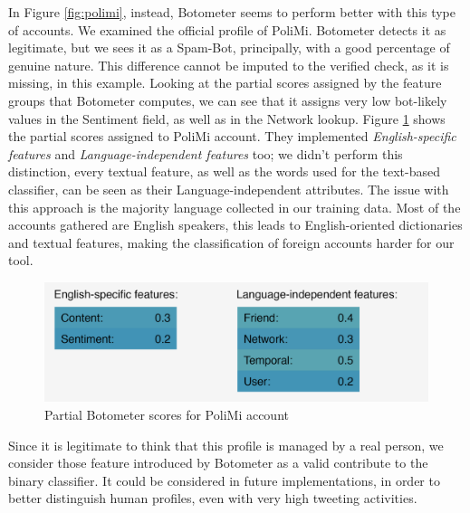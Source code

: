 In Figure \ref{fig:polimi}, instead, Botometer seems to perform better with this type of accounts. We examined the official profile of PoliMi. Botometer detects it as legitimate, but we sees it as a Spam-Bot, principally, with a good percentage of genuine nature. This difference cannot be imputed to the verified check, as it is missing, in this example.
Looking at the partial scores assigned by the feature groups that Botometer computes, we can see that it assigns very low bot-likely values in the Sentiment field, as well as in the Network lookup. Figure \ref{fig:polimi_details} shows the partial scores assigned to PoliMi account. They implemented \textit{English-specific features} and \textit{Language-independent features} too; we didn't perform this distinction, every textual feature, as well as the words used for the text-based classifier, can be seen as their Language-independent attributes. The issue with this approach is the majority language collected in our training data. Most of the accounts gathered are English speakers, this leads to English-oriented dictionaries and textual features, making the classification of foreign accounts harder for our tool.
\begin{figure}[htp!]
	\begin{center}
		\includegraphics[width=0.8\columnwidth]{chapter7/figure/polimi_details.png}\par
	\end{center}
	\caption{Partial Botometer scores for PoliMi account}
	\label{fig:polimi_details}
\end{figure}

Since it is legitimate to think that this profile is managed by a real person, we consider those feature introduced by Botometer as a valid contribute to the binary classifier. It could be considered in future implementations, in order to better distinguish human profiles, even with very high tweeting activities.

